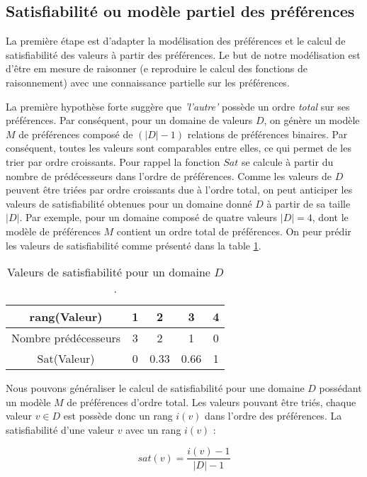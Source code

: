 \documentclass{llncs}
\begin{document}
	
	\subsection{Satisfiabilité ou modèle partiel des préférences}
	\label{sec:sat}
	La première étape est d'adapter la modélisation des préférences et le calcul de satisfiabilité des valeurs à partir des préférences. Le but de notre modélisation est d'être em mesure de raisonner (e reproduire le calcul des fonctions de raisonnement) avec une connaissance partielle sur les préférences. 
	
	La première hypothèse forte suggère que \emph{'l'autre'} possède un ordre \emph{total} sur ses préférences. Par conséquent, pour un domaine de valeurs $D$, on génère un modèle $M$ de préférences composé de $(|D| -1)$ relations de préférences binaires. Par conséquent, toutes les valeurs sont comparables entre elles, ce qui permet de les trier par ordre croissants.
	 Pour rappel la fonction $Sat$ se calcule à partir du nombre de prédécesseurs dans l'ordre de préférences. Comme les valeurs de $D$ peuvent être triées par ordre croissants due à l'ordre total, on peut anticiper les valeurs de satisfiabilité obtenues pour un domaine donné $D$ à partir de sa taille $|D|$.
	 Par exemple, pour un domaine composé de quatre valeurs $ |D|=4$, dont le modèle de préférences $M$ contient un ordre total de préférences. On peur prédir les valeurs de satisfiabilité comme présenté dans la table \ref{poss}.
	 
	 \begin{table}
	 	\centering
	 	\begin{tabular}{ |c|c|c|c|c| }
		 	\hline				
		 	rang(Valeur) & 1 & 2 & 3 & 4 \\
		 	\hline
		 	Nombre prédécesseurs & 3 & 2 & 1& 0 \\
		 	\hline
		 	Sat(Valeur) & 0 & 0.33 & 0.66 &1 \\
		 	\hline
		 	
	 \end{tabular}
	 \caption{Valeurs de satisfiabilité pour un domaine $D$.}
	 \label{poss}
	 \end{table}
	
	Nous pouvons généraliser le calcul de satisfiabilité pour une domaine $D$ possédant un modèle $M$ de préférences d'ordre total. Les valeurs pouvant être triés, chaque valeur $v \in D$ est possède donc un rang $i(v)$ dans l'ordre des préférences. La satisfiabilité d'une valeur $v$ avec un rang $i(v)$ :
	
	\begin{equation}
		sat(v) = \frac{i(v)-1}{|D|-1}
	\end{equation} 
	
\end{document}
